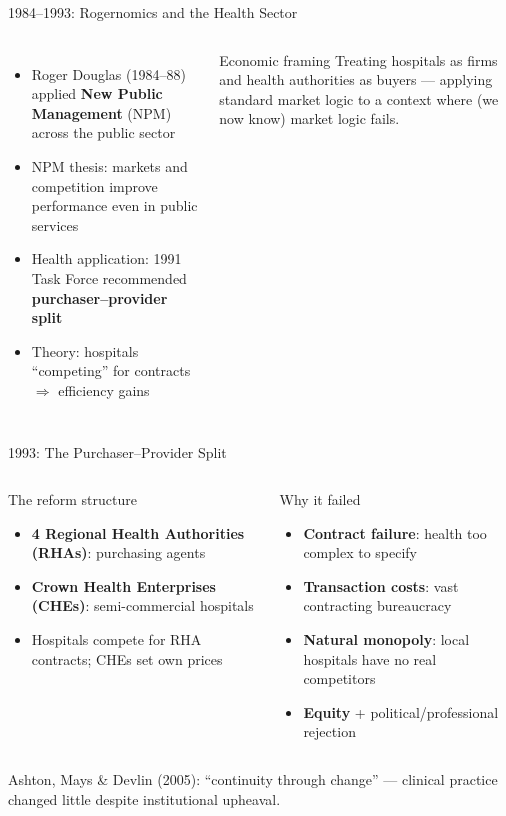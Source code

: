 \documentclass[aspectratio=169, 12pt]{beamer}
\begin{document}
\begin{frame}{1984--1993: Rogernomics and the Health Sector}
  \begin{columns}
      \small
      \begin{itemize}
        \item Roger Douglas (1984--88) applied \textbf{New Public Management} (NPM) across the public sector
        \item NPM thesis: markets and competition improve performance even in public services
        \item Health application: 1991 Task Force recommended \textbf{purchaser--provider split}
        \item Theory: hospitals ``competing'' for contracts $\Rightarrow$ efficiency gains
      \end{itemize}
      \begin{alertblock}{Economic framing}
        \small Treating hospitals as firms and health authorities as buyers --- applying standard market logic to a context where (we now know) market logic fails.
      \end{alertblock}
  \end{columns}
\end{frame}

\begin{frame}{1993: The Purchaser--Provider Split}
  \begin{columns}
      \begin{block}{The reform structure}
        \footnotesize
        \begin{itemize}
          \item \textbf{4 Regional Health Authorities (RHAs)}: purchasing agents
          \item \textbf{Crown Health Enterprises (CHEs)}: semi-commercial hospitals
          \item Hospitals compete for RHA contracts; CHEs set own prices
        \end{itemize}
      \end{block}
      \begin{alertblock}{Why it failed}
        \footnotesize
        \begin{itemize}
          \item \textbf{Contract failure}: health too complex to specify
          \item \textbf{Transaction costs}: vast contracting bureaucracy
          \item \textbf{Natural monopoly}: local hospitals have no real competitors
          \item \textbf{Equity} + political/professional rejection
        \end{itemize}
      \end{alertblock}
  \end{columns}
  {\footnotesize Ashton, Mays \& Devlin (2005): ``continuity through change'' --- clinical practice changed little despite institutional upheaval.}
\end{frame}
\end{document}

